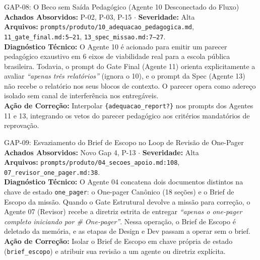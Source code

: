 \documentclass[11pt,a4paper]{article}
\begin{document}
\begin{gapbox}{GAP-08: O Beco sem Saída Pedagógico (Agente 10 Desconectado do Fluxo)}
\textbf{Achados Absorvidos:} P-02, P-03, P-15 $\cdot$ \textbf{Severidade:} Alta\\
\textbf{Arquivos:} \texttt{prompts/produto/10\_adequacao\_pedagogica.md}, \texttt{11\_gate\_final.md:5--21}, \texttt{13\_spec\_missao.md:7--27}.\\
\textbf{Diagnóstico Técnico:} O Agente 10 é acionado para emitir um parecer pedagógico exaustivo em 6 eixos de viabilidade real para a escola pública brasileira. Todavia, o prompt do Gate Final (Agente 11) orienta explicitamente a avaliar \textit{``apenas três relatórios''} (ignora o 10), e o prompt da Spec (Agente 13) não recebe o relatório nos seus blocos de contexto. O parecer opera como adereço isolado sem canal de interferência nos entregáveis.\\
\textbf{Ação de Correção:} Interpolar \texttt{\{adequacao\_report?\}} nos prompts dos Agentes 11 e 13, integrando os vetos do parecer pedagógico aos critérios mandatórios de reprovação.
\end{gapbox}

\begin{gapbox}{GAP-09: Esvaziamento do Brief de Escopo no Loop de Revisão de One-Pager}
\textbf{Achados Absorvidos:} Novo Gap 4, P-13 $\cdot$ \textbf{Severidade:} Alta\\
\textbf{Arquivos:} \texttt{prompts/produto/04\_secoes\_apoio.md:108}, \texttt{07\_revisor\_one\_pager.md:38}.\\
\textbf{Diagnóstico Técnico:} O Agente 04 concatena dois documentos distintos na chave de estado \texttt{one\_pager}: o One-pager Canônico (18 seções) e o Brief de Escopo da missão. Quando o Gate Estrutural devolve a missão para correção, o Agente 07 (Revisor) recebe a diretriz estrita de entregar \textit{``apenas o one-pager completo iniciando por \# One-pager''}. Nessa operação, o Brief de Escopo é deletado da memória, e as etapas de Design e Dev passam a operar sem o brief.\\
\textbf{Ação de Correção:} Isolar o Brief de Escopo em chave própria de estado (\texttt{brief\_escopo}) e atribuir sua revisão a um agente ou diretriz explícita.
\end{gapbox}
\end{document}
